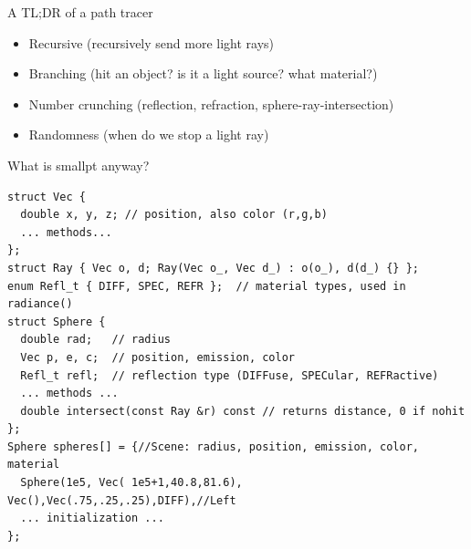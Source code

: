 \documentclass[8pt]{beamer}
\begin{document}
\begin{frame}[fragile]{A TL;DR of a path tracer}
\begin{itemize}
\item Recursive (recursively send more light rays)
\item Branching (hit an object? is it a light source? what material?)
\item Number crunching (reflection, refraction, sphere-ray-intersection)
\item Randomness (when do we stop a light ray)
\end{itemize}
\end{frame}

\begin{frame}[fragile]{What is smallpt anyway?}
\begin{verbatim}
struct Vec {      
  double x, y, z; // position, also color (r,g,b) 
  ... methods...
}; 
struct Ray { Vec o, d; Ray(Vec o_, Vec d_) : o(o_), d(d_) {} }; 
enum Refl_t { DIFF, SPEC, REFR };  // material types, used in radiance() 
struct Sphere { 
  double rad;   // radius 
  Vec p, e, c;  // position, emission, color 
  Refl_t refl;  // reflection type (DIFFuse, SPECular, REFRactive) 
  ... methods ...
  double intersect(const Ray &r) const // returns distance, 0 if nohit 
}; 
Sphere spheres[] = {//Scene: radius, position, emission, color, material 
  Sphere(1e5, Vec( 1e5+1,40.8,81.6), Vec(),Vec(.75,.25,.25),DIFF),//Left 
  ... initialization ...
}; 
\end{verbatim}
\end{frame}
\end{document}
